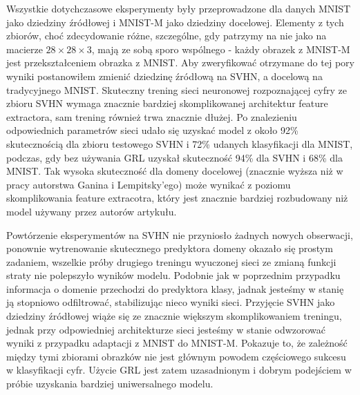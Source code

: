 \documentclass{article}
\begin{document}
\par
Wszystkie dotychczasowe eksperymenty były przeprowadzone dla danych MNIST jako dziedziny źródłowej i MNIST-M jako dziedziny docelowej. Elementy z tych zbiorów, choć zdecydowanie różne, szczególne, gdy patrzymy na nie jako na macierze $28 \times 28 \times 3$, mają ze sobą sporo wspólnego - każdy obrazek z MNIST-M jest przekształceniem obrazka z MNIST. Aby zweryfikować otrzymane do tej pory wyniki postanowiłem zmienić dziedzinę źródłową na SVHN, a docelową na tradycyjnego MNIST. Skuteczny trening sieci neuronowej rozpoznającej cyfry ze zbioru SVHN wymaga znacznie bardziej skomplikowanej architektur feature extractora, sam trening również trwa znacznie dłużej. Po znalezieniu odpowiednich parametrów sieci udało się uzyskać model z około 92\% skutecznością dla zbioru testowego SVHN i 72\% udanych klasyfikacji dla MNIST, podczas, gdy bez używania GRL uzyskał skuteczność 94\% dla SVHN i 68\% dla MNIST. Tak wysoka skuteczność dla domeny docelowej (znacznie wyższa niż w pracy autorstwa Ganina i Lempitsky'ego) może wynikać z poziomu skomplikowania feature extracotra, który jest znacznie bardziej rozbudowany niż model używany przez autorów artykułu.
\par
Powtórzenie eksperymentów na SVHN nie przyniosło żadnych nowych obserwacji, ponownie wytrenowanie skutecznego predyktora domeny okazało się prostym zadaniem, wszelkie próby drugiego treningu wyuczonej sieci ze zmianą funkcji straty nie polepszyło wyników modelu. Podobnie jak w poprzednim przypadku informacja o domenie przechodzi do predyktora klasy, jadnak jesteśmy w stanię ją stopniowo odfiltrować, stabilizując nieco wyniki sieci. Przyjęcie SVHN jako dziedziny źródłowej wiąże się ze znacznie większym skomplikowaniem treningu, jednak przy odpowiedniej architekturze sieci jesteśmy w stanie odwzorować wyniki z przypadku adaptacji z MNIST do MNIST-M. Pokazuje to, że zależność między tymi zbiorami obrazków nie jest głównym powodem częściowego sukcesu w klasyfikacji cyfr. Użycie GRL jest zatem uzasadnionym i dobrym podejściem w próbie uzyskania bardziej uniwersalnego modelu.
\par
\end{document}
